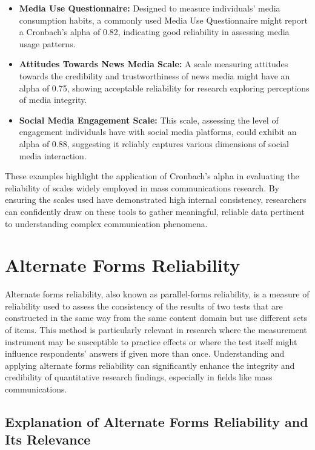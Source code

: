\documentclass[
]{book}
\begin{document}
\begin{itemize}
\item
  \textbf{Media Use Questionnaire:} Designed to measure individuals' media consumption habits, a commonly used Media Use Questionnaire might report a Cronbach's alpha of 0.82, indicating good reliability in assessing media usage patterns.
\item
  \textbf{Attitudes Towards News Media Scale:} A scale measuring attitudes towards the credibility and trustworthiness of news media might have an alpha of 0.75, showing acceptable reliability for research exploring perceptions of media integrity.
\item
  \textbf{Social Media Engagement Scale:} This scale, assessing the level of engagement individuals have with social media platforms, could exhibit an alpha of 0.88, suggesting it reliably captures various dimensions of social media interaction.
\end{itemize}

These examples highlight the application of Cronbach's alpha in evaluating the reliability of scales widely employed in mass communications research. By ensuring the scales used have demonstrated high internal consistency, researchers can confidently draw on these tools to gather meaningful, reliable data pertinent to understanding complex communication phenomena.

\hypertarget{alternate-forms-reliability}{%
\section{Alternate Forms Reliability}\label{alternate-forms-reliability}}

Alternate forms reliability, also known as parallel-forms reliability, is a measure of reliability used to assess the consistency of the results of two tests that are constructed in the same way from the same content domain but use different sets of items. This method is particularly relevant in research where the measurement instrument may be susceptible to practice effects or where the test itself might influence respondents' answers if given more than once. Understanding and applying alternate forms reliability can significantly enhance the integrity and credibility of quantitative research findings, especially in fields like mass communications.

\hypertarget{explanation-of-alternate-forms-reliability-and-its-relevance}{%
\subsection*{Explanation of Alternate Forms Reliability and Its Relevance}\label{explanation-of-alternate-forms-reliability-and-its-relevance}}
\end{document}
